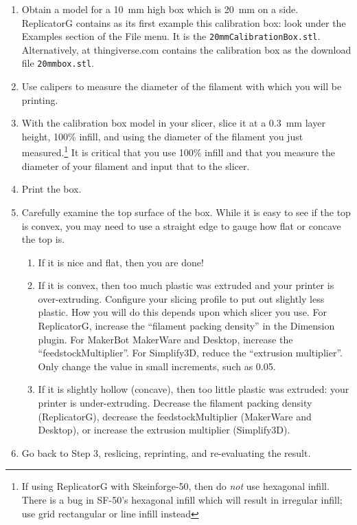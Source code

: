 \begin{enumerate}

\item Obtain a model for a 10~mm high box which is 20~mm on a side.  ReplicatorG contains as its first example this calibration box:
look under the Examples section of the File menu.  It is the
{\smaller\texttt{20mm\textunderscore Calibration\textunderscore Box.stl}}.
Alternatively,  at thingiverse.com contains the calibration box as the download file {\smaller\texttt{20mmbox.stl}}.

\item Use calipers to measure the diameter of the filament with which you will be printing.

\item With the calibration box model in your slicer, slice it at a 0.3~mm
layer height, 100\% infill, and using the diameter of the filament you just
measured.\footnote{If using ReplicatorG with Skeinforge-50,
then do \emph{not} use hexagonal infill.   There is a bug in SF-50's hexagonal
infill which will result in irregular infill; use grid rectangular or line infill instead}  It is critical that you use
100\% infill and that you measure the diameter of your filament and input that
to the slicer.

\item Print the box.

\item Carefully examine the top surface of the box.  While it is easy to
see if the top is convex, you may need to use a
straight edge to gauge how flat or concave the top is.

\begin{enumerate}
\item If it is nice and flat, then you are done!
\item If it is convex, then
too much plastic was extruded and your printer is over-extruding.
Configure your slicing profile to put out slightly less plastic.  How you will do
this depends upon which slicer you use. For ReplicatorG, increase the 
``filament packing density'' in the Dimension plugin.  For MakerBot MakerWare
and Desktop, increase the ``feedstockMultiplier''.  For Simplify3D, reduce the
``extrusion multiplier''.  Only change the value in small increments, such as 0.05.
\item If it is slightly hollow (concave), then too little plastic was
extruded: your printer is under-extruding.  Decrease the filament packing
density (ReplicatorG), decrease the feedstockMultiplier (MakerWare and Desktop),
or increase the extrusion multiplier (Simplify3D).
\end{enumerate}

\item Go back to Step 3, reslicing, reprinting, and re-evaluating the result.
\end{enumerate}

